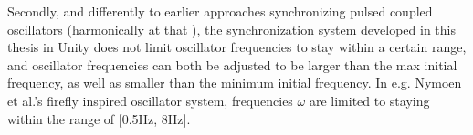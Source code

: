 Secondly, and differently to earlier approaches synchronizing pulsed coupled oscillators (harmonically at that \cite{nymoen_synch}), the synchronization system developed in this thesis in Unity does not limit oscillator frequencies to stay within a certain range, and oscillator frequencies can both be adjusted to be larger than the max initial frequency, as well as smaller than the minimum initial frequency. In e.g. Nymoen et al.'s firefly inspired oscillator system, frequencies $\omega$ are limited to staying within the range of $[$0.5Hz, 8Hz$]$.


